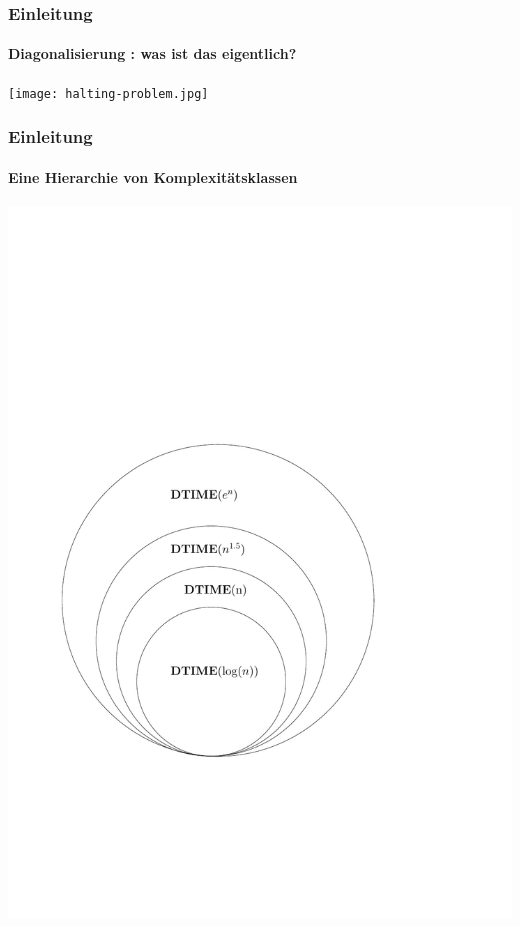 \begin{frame}
	\frametitle{Einleitung}
	\framesubtitle{Diagonalisierung : was ist das eigentlich?}
	
	\texttt{[image: halting-problem.jpg]}
\end{frame}
\begin{frame}
	\frametitle{Einleitung}
	\framesubtitle{Eine Hierarchie von Komplexitätsklassen}
	\includegraphics[scale=0.5]{images/timehierarchy.pdf}
\end{frame}
